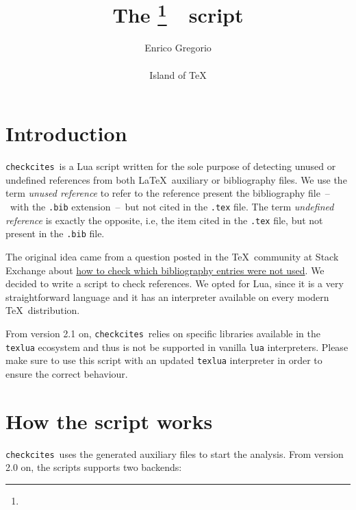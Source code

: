 \documentclass[12pt,a4paper]{article}
\title{The \checkcites\footnote{\version}\ \ script}
\author{%
  Enrico Gregorio\\\email{Enrico.Gregorio@univr.it}\\[3ex]
  Island of \TeX\\\email{https://gitlab.com/islandoftex}%
}
\date{}
\newcommand{\checkcites}{\texttt{checkcites}}
\newenvironment{infoblock}[1]
  {\par\addvspace{\medskipamount}
   \begin{tcolorbox}[colframe=DarkTurquoise,coltitle=black,fonttitle=\bfseries,title=#1]}
  {\end{tcolorbox}\addvspace{\medskipamount}}
\begin{document}
\maketitle

\tableofcontents

\section{Introduction}
\label{sec:intro}

\checkcites\  is  a  Lua  script  written for  the  sole  purpose  of
detecting unused or undefined  references from both \LaTeX\ auxiliary
or bibliography  files. We  use the  term \emph{unused  reference} to
refer  to the  reference  present the  bibliography file~--~with  the
\verb|.bib|  extension~--~but  not  cited in  the  \verb|.tex|  file.
The  term \emph{undefined  reference} is  exactly the  opposite, i.e,
the  item cited  in  the \verb|.tex|  file, but  not  present in  the
\verb|.bib| file.

The    original     idea    came     from    a     question    posted
in    the     \TeX\    community    at    Stack     Exchange    about
\href{http://tex.stackexchange.com/questions/43276}{how    to   check
which  bibliography entries  were not  used}. We  decided to  write a
script  to check  references. We  opted for  Lua, since it is a  very
straightforward language and it has an interpreter available on every
modern \TeX\ distribution.

\begin{infoblock}{Attention!}
From  version  2.1  on,  \checkcites\  relies  on  specific  libraries
available in the \verb|texlua| ecosystem  and thus is not be supported
in  vanilla \verb|lua|  interpreters.  Please make  sure  to use  this
script with  an updated \verb|texlua|  interpreter in order  to ensure
the correct behaviour.
\end{infoblock}

\section{How the script works}
\label{sec:howto}

\checkcites\  uses  the  generated   auxiliary  files  to  start  the
analysis. From version 2.0 on, the scripts supports two backends:
\end{document}
